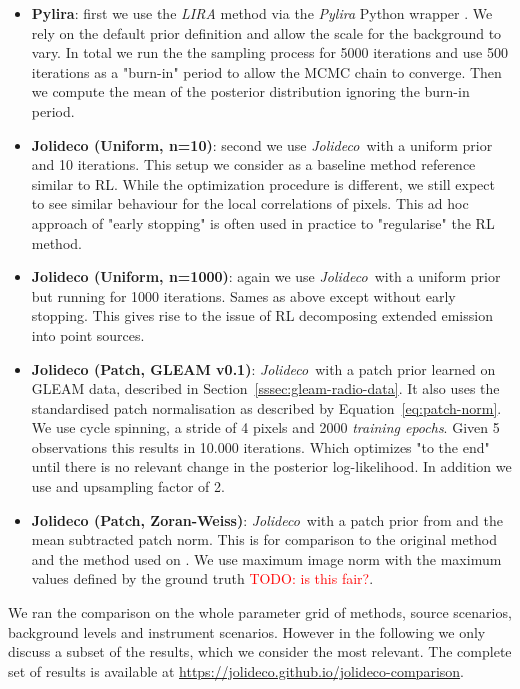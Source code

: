 \documentclass[twocolumn]{aastex631}
\newcommand{\jolideco}{\textit{Jolideco}~}
\newcommand{\todo}[1]{\textcolor{red}{TODO: #1}\PackageWarning{TODO:}{#1!}}
\begin{document}
    \begin{itemize}
        \item \textbf{Pylira}: first we use the \textit{LIRA} method \citep{Esch2004} via the \textit{Pylira} Python wrapper \citep{Donath2022}. We rely on the default prior definition and allow the scale for the background to vary. In total we run the the sampling process for 5000 iterations and use 500 iterations as a "burn-in" period to allow the MCMC chain to converge. Then we compute the mean of the posterior distribution ignoring the burn-in period.
        
        \item \textbf{Jolideco (Uniform, n=10)}: second we use \jolideco with a uniform prior and 10 iterations. This setup we consider as a baseline method reference similar to RL. While the optimization procedure is different, we still expect to see similar behaviour for the local correlations of pixels. This ad hoc approach of "early stopping" is often used in practice to "regularise" the RL method.
        
        \item \textbf{Jolideco (Uniform, n=1000)}: again we use \jolideco with a uniform prior but running for 1000 iterations. Sames as above except without early stopping. This gives rise to the issue of RL decomposing extended emission into point sources. 
        
        \item \textbf{Jolideco (Patch, GLEAM v0.1)}: \jolideco with a patch prior learned on GLEAM data, described in Section~\ref{sssec:gleam-radio-data}. It also uses the standardised patch normalisation as described by Equation~\ref{eq:patch-norm}. We use cycle spinning, a stride of 4 pixels and 2000 \textit{training epochs}. Given 5 observations this results in 10.000 iterations. Which optimizes "to the end" until there is no relevant change in the posterior log-likelihood. In addition we use and upsampling factor of 2.
        
        \item \textbf{Jolideco (Patch, Zoran-Weiss)}: \jolideco with a patch prior from \cite{Zoran2011} and the mean subtracted patch norm. This is for comparison to the original method and the method used on \cite{Bouman2016}. We use maximum image norm with the maximum values defined by the ground truth \todo{is this fair?}.
    \end{itemize}

    We ran the comparison on the whole parameter grid of methods, source scenarios, background levels and instrument scenarios. However in the following we only discuss a subset of the results, which we consider the most relevant. The complete set of results is available at \url{https://jolideco.github.io/jolideco-comparison}.
\end{document}
